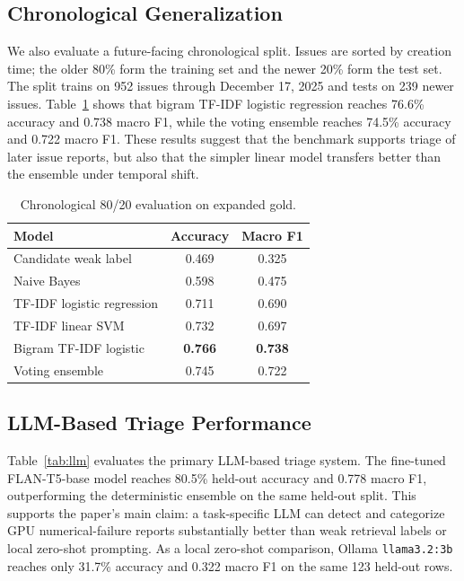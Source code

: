 \documentclass[conference]{IEEEtran}
\begin{document}
\subsection{Chronological Generalization}

We also evaluate a future-facing chronological split. Issues are sorted by
creation time; the older 80\% form the training set and the newer 20\% form the
test set. The split trains on 952 issues through December 17, 2025 and tests on
239 newer issues. Table~\ref{tab:time} shows that bigram TF-IDF logistic
regression reaches 76.6\% accuracy and 0.738 macro F1, while the voting
ensemble reaches 74.5\% accuracy and 0.722 macro F1. These results suggest
that the benchmark supports triage of later issue reports, but also that the
simpler linear model transfers better than the ensemble under temporal shift.

\begin{table}[t]
\centering
\caption{Chronological 80/20 evaluation on expanded gold.}
\label{tab:time}
\begin{tabular}{lcc}
\toprule
Model & Accuracy & Macro F1 \\
\midrule
Candidate weak label & 0.469 & 0.325 \\
Naive Bayes & 0.598 & 0.475 \\
TF-IDF logistic regression & 0.711 & 0.690 \\
TF-IDF linear SVM & 0.732 & 0.697 \\
Bigram TF-IDF logistic & \textbf{0.766} & \textbf{0.738} \\
Voting ensemble & 0.745 & 0.722 \\
\bottomrule
\end{tabular}
\end{table}

\subsection{LLM-Based Triage Performance}

Table~\ref{tab:llm} evaluates the primary LLM-based triage system. The
fine-tuned FLAN-T5-base model reaches 80.5\% held-out accuracy and 0.778 macro
F1, outperforming the deterministic ensemble on the same held-out split. This
supports the paper's main claim: a task-specific LLM can detect and categorize
GPU numerical-failure reports substantially better than weak retrieval labels
or local zero-shot prompting. As a local zero-shot comparison, Ollama
\texttt{llama3.2:3b} reaches only 31.7\% accuracy and 0.322 macro F1 on the
same 123 held-out rows.
\end{document}
